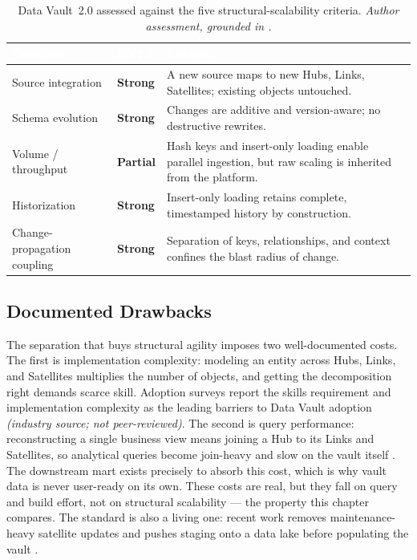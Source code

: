 \begin{table}[H]
\centering
\renewcommand{\arraystretch}{1.35}
\caption{Data Vault~2.0 assessed against the five structural-scalability criteria. \textit{Author assessment, grounded in \parencite{linstedt2015}.}}
\label{tab:dv2-structural-assessment}
\begin{tabularx}{\linewidth}{|>{\raggedright\arraybackslash}p{3.8cm}|>{\raggedright\arraybackslash}p{2.0cm}|>{\raggedright\arraybackslash}X|}
\hline
\rowcolor{tblheader}
\textcolor{white}{\textbf{Criterion}} &
\textcolor{white}{\textbf{DV2.0}} &
\textcolor{white}{\textbf{Evidence}} \\
\hline
Source integration & \textbf{Strong} & A new source maps to new Hubs, Links, Satellites; existing objects untouched. \\
Schema evolution & \textbf{Strong} & Changes are additive and version-aware; no destructive rewrites. \\
Volume / throughput & \textbf{Partial} & Hash keys and insert-only loading enable parallel ingestion, but raw scaling is inherited from the platform. \\
Historization & \textbf{Strong} & Insert-only loading retains complete, timestamped history by construction. \\
Change-propagation coupling & \textbf{Strong} & Separation of keys, relationships, and context confines the blast radius of change. \\
\hline
\end{tabularx}
\end{table}

\subsection{Documented Drawbacks}
\label{subsec:ch1-dv2-drawbacks}

The separation that buys structural agility imposes two well-documented costs. The first is implementation complexity: modeling an entity across Hubs, Links, and Satellites multiplies the number of objects, and getting the decomposition right demands scarce skill. Adoption surveys report the skills requirement and implementation complexity as the leading barriers to Data Vault adoption \parencite{analyticscreator2025} \textit{(industry source; not peer-reviewed)}. The second is query performance: reconstructing a single business view means joining a Hub to its Links and Satellites, so analytical queries become join-heavy and slow on the vault itself \parencite{analyticscreator2025}. The downstream mart exists precisely to absorb this cost, which is why vault data is never user-ready on its own. These costs are real, but they fall on query and build effort, not on structural scalability --- the property this chapter compares. The standard is also a living one: recent work removes maintenance-heavy satellite updates and pushes staging onto a data lake before populating the vault \parencite{giebler2019dv}.

